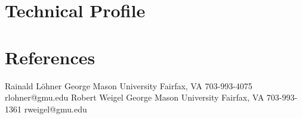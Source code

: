 \documentclass[11pt,a4paper]{moderncv}
\begin{document}

\section{Technical Profile}

\section{References}
 {Rainald L{\"o}hner \newline{} George Mason University \newline{} Fairfax, VA \newline{} 703-993-4075 \newline{} rlohner@gmu.edu}
 {Robert Weigel \newline{} George Mason University \newline{} Fairfax, VA \newline{} 703-993-1361 \newline{} rweigel@gmu.edu}
\end{document}
